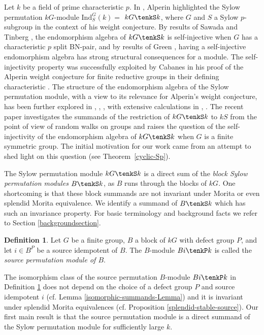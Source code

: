 \documentclass{amsart}
\theoremstyle{plain}\newtheorem{Theorem}{Theorem}[section]
\theoremstyle{plain}\newtheorem{Conjecture}[Theorem]{Conjecture}
\theoremstyle{plain}\newtheorem{Corollary}[Theorem]{Corollary}
\theoremstyle{plain}\newtheorem{Lemma}[Theorem]{Lemma}
\theoremstyle{plain}\newtheorem{Proposition}[Theorem]{Proposition}
\theoremstyle{definition}\newtheorem{Definition}[Theorem]{Definition}
\theoremstyle{definition}\newtheorem{Example}[Theorem]{Example}
\theoremstyle{definition}\newtheorem{Examples}[Theorem]{Examples}
\theoremstyle{definition}\newtheorem{Exercise}[Theorem]{Exercise}
\theoremstyle{definition}\newtheorem{Notation}[Theorem]{Notation}
\theoremstyle{definition}\newtheorem{Remark}[Theorem]{Remark}
\theoremstyle{definition}\newtheorem{Remarks}[Theorem]{Remarks}
\theoremstyle{plain}\newtheorem{Statement}[Theorem]{}
\def\Ind{\mathrm{Ind}}    \def\tenC{\otimes_C}
\begin{document}
Let $k$ be a field of prime characteristic $p$.  In \cite{Alp87}, Alperin   highlighted  the   
Sylow permutation $kG$-module $\Ind^G_S(k)=$ $kG\tenkS k$, where $G$  and
$S$ a Sylow $p$-subgroup in the context of his 
weight conjecture. By results of Sawada \cite{Sawada77}  and  Tinberg \cite{Tin80}, 
the  endomorphism algebra  of   $kG\tenkS k$
is  self-injective when $G$ has a characteristic $p$ split BN-pair, and by 
results of Green \cite{Green78},  having  a self-injective endomorphism 
algebra has strong structural consequences for a module.  The   self-injectivity  
property  was successfully  exploited  by  Cabanes   in  his proof of the Alperin 
weight  conjecture  for  finite reductive  groups  in their defining characteristic 
\cite{Ca84}.
The structure of  the endomorphism algebra of the Sylow permutation module,
with a view to its  relevance for  Alperin's weight conjecture, has   been  further  
explored  in \cite{Nae}, \cite{HKN}, \cite{BaTu}, with extensive calculations  in
 \cite{NaehrigPhD},  \cite{Nae}.    The  recent paper \cite{DGGLNSS} investigates 
 the summands   of the  restriction of  $kG\tenkS k$ to $kS$  from 
the point of view   of random walks on groups   and  raises the question of the  
self-injectivity   of  the 
endomorphism algebra  of   $kG\tenkS k$  when $G$ is a finite symmetric group. 
The  initial  motivation for  our work came    from 
an  attempt to  shed light on  this question (see Theorem~\ref{cyclic-Sp}).

\medskip
The Sylow permutation module  $kG\tenkS k$ is a  direct sum of   the  {\it block 
Sylow permutation  modules}  $B\tenkS k$, as $B$ runs through the blocks of 
$kG$.  One shortcoming   is that  these block summands  are not invariant  under   
Morita or even splendid Morita  equivalence.  We identify  a summand   of  
$B\tenkS k$  which has   such an invariance  property. 
For basic terminology and background facts  we refer to Section  
\ref{backgroundsection}. 

\begin{Definition} \label{source-module-Def}
Let $G$ be a finite group, $B$ a block of $kG$ with defect group $P$, and let
$i\in B^P$ be a source idempotent of $B$. The $B$-module $Bi\tenkP k$ is
called  the  {\em source permutation module of $B$}.
\end{Definition}

The isomorphism class of the source permutation $B$-module $Bi\tenkP k$ in
Definition \ref{source-module-Def}  does not depend on the choice of a defect 
group $P$ and source idempotent $i$ (cf.  Lemma 
\ref{isomorphic-summands-Lemma})  and it 
is invariant under splendid Morita equivalences (cf. Proposition 
\ref{splendid-stable-source}).
Our first main result is that the  source permutation module is 
 a direct summand of the   Sylow permutation module  for sufficiently large $k$.
\end{document}
